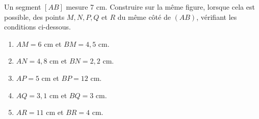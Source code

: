 \begin{exercice}
    Un segment $[AB]$ mesure 7 cm. Construire sur la même figure, lorsque cela est possible, des points $M, N, P, Q$ et $R$ du même côté de $(AB)$, vérifiant les conditions ci-dessous.
    \begin{enumerate}
       \item $AM = 6$ cm et $BM = 4,5$ cm.
       \item $AN=4,8$ cm et $BN=2,2$ cm.
       \item $AP = 5$ cm et $BP = 12$ cm.
       \item $AQ=3,1$ cm et $BQ=3$ cm.
       \item $AR=11$ cm et $BR=4$ cm.
    \end{enumerate}
\end{exercice}